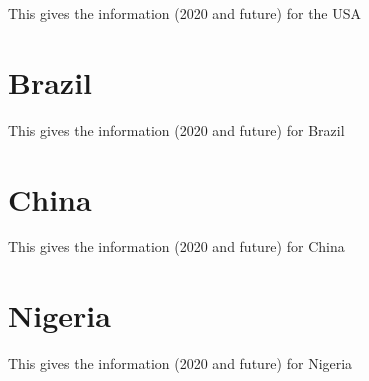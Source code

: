 This gives the information (2020 and future) for the USA

\section{Brazil}

This gives the information (2020 and future) for Brazil

\section{China}

This gives the information (2020 and future) for China

\section{Nigeria}

This gives the information (2020 and future) for Nigeria

